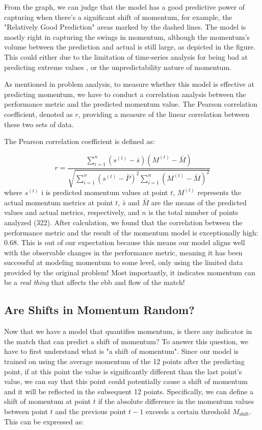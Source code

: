\documentclass[12pt]{article}  %
\begin{document}
From the graph, we can judge that the model has a good predictive power of capturing when there's a significant shift of momentum, for example, the "Relatively Good Prediction" areas marked by the dashed lines. The model is mostly right in capturing the swings in momentum, although the momentum's volume between the prediction and actual is still large, as depicted in the figure. This could either due to the limitation of time-series analysis for being bad at predicting extreme values \cite{14}, or the unpredictability nature of momentum.

As mentioned in problem analysis, to measure whether this model is effective at predicting momentum, we have to conduct a correlation analysis between the performance metric and the predicted momentum value. The Pearson correlation coefficient, denoted as \( r \), providing a measure of the linear correlation between these two sets of data.

The Pearson correlation coefficient is defined as:

\[ r = \frac{\sum_{i=1}^{n} (s^{(t)} - \bar{s})(M^{(t)} - \bar{M})}{\sqrt{\sum_{i=1}^{n} (s^{(t)} - \bar{P})^2 \sum_{i=1}^{n} (M^{(t)} - \bar{M})^2}} \]
where \( s^{(t)} \) i is predicted momentum values at point \( t \), \( M^{(t)} \) represents the actual momentum metrics at point \( t \), \( \bar{s} \) and \( \bar{M} \) are the means of the predicted values and actual metrics, respectively, and \( n \) is the total number of points analyzed (322). After calculation, we found that the correlation between the performance metric and the result of the momentum model is exceptionally high: $\mathbf{0.68}$. This is out of our expectation because this means our model aligns well with the observable changes in the performance metric, meaning it has been successful at modeling momentum to some level, only using the limited data provided by the original problem! Most importantly, it indicates momentum can be a \textit{real thing} that affects the ebb and flow of the match!

\subsection{Are Shifts in Momentum Random?}
Now that we have a model that quantifies momentum, is there any indicator in the match that can predict a shift of momentum? To answer this question, we have to first understand what is "a shift of momentum". Since our model is trained on using the average momentum of the 12 points after the predicting point, if at this point the value is significantly different than the last point's value, we can say that this point could potentially cause a shift of momentum and it will be reflected in the subsequent 12 points. Specifically, we can define a shift of momentum at point \( t \) if the absolute difference in the momentum values between point \( t \) and the previous point \( t-1 \) exceeds a certain threshold \( M_{\text{shift}} \). This can be expressed as:
\end{document}
